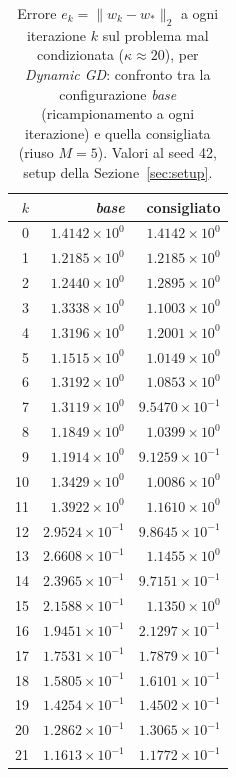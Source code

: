 \begin{table}[H]
\centering
\footnotesize
\renewcommand{\arraystretch}{0.85}
\setlength{\tabcolsep}{8pt}
\caption{Errore $e_k=\|w_k-w_*\|_2$ a ogni iterazione $k$ sul problema mal condizionata ($\kappa\approx 20$), per \emph{Dynamic GD}: confronto tra la configurazione \emph{base} (ricampionamento a ogni iterazione) e quella consigliata (riuso $M{=}5$). Valori al seed 42, setup della Sezione~\ref{sec:setup}.}
\label{tab:riuso_cons_malcond_gd}
\begin{tabular}{@{}rrr@{}}
\toprule
$k$ & \emph{base} & consigliato\\
\midrule
0 & $1.4142\times10^{0}$ & $1.4142\times10^{0}$\\
1 & $1.2185\times10^{0}$ & $1.2185\times10^{0}$\\
2 & $1.2440\times10^{0}$ & $1.2895\times10^{0}$\\
3 & $1.3338\times10^{0}$ & $1.1003\times10^{0}$\\
4 & $1.3196\times10^{0}$ & $1.2001\times10^{0}$\\
5 & $1.1515\times10^{0}$ & $1.0149\times10^{0}$\\
6 & $1.3192\times10^{0}$ & $1.0853\times10^{0}$\\
7 & $1.3119\times10^{0}$ & $9.5470\times10^{-1}$\\
8 & $1.1849\times10^{0}$ & $1.0399\times10^{0}$\\
9 & $1.1914\times10^{0}$ & $9.1259\times10^{-1}$\\
10 & $1.3429\times10^{0}$ & $1.0086\times10^{0}$\\
11 & $1.3922\times10^{0}$ & $1.1610\times10^{0}$\\
12 & $2.9524\times10^{-1}$ & $9.8645\times10^{-1}$\\
13 & $2.6608\times10^{-1}$ & $1.1455\times10^{0}$\\
14 & $2.3965\times10^{-1}$ & $9.7151\times10^{-1}$\\
15 & $2.1588\times10^{-1}$ & $1.1350\times10^{0}$\\
16 & $1.9451\times10^{-1}$ & $2.1297\times10^{-1}$\\
17 & $1.7531\times10^{-1}$ & $1.7879\times10^{-1}$\\
18 & $1.5805\times10^{-1}$ & $1.6101\times10^{-1}$\\
19 & $1.4254\times10^{-1}$ & $1.4502\times10^{-1}$\\
20 & $1.2862\times10^{-1}$ & $1.3065\times10^{-1}$\\
21 & $1.1613\times10^{-1}$ & $1.1772\times10^{-1}$\\

\end{tabular}
\end{table}
